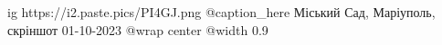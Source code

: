  
 
 
 
 

\ifcmt
  ig https://i2.paste.pics/PI4GJ.png
	@caption_here Міський Сад, Маріуполь, скріншот 01-10-2023
  @wrap center
  @width 0.9
\fi

